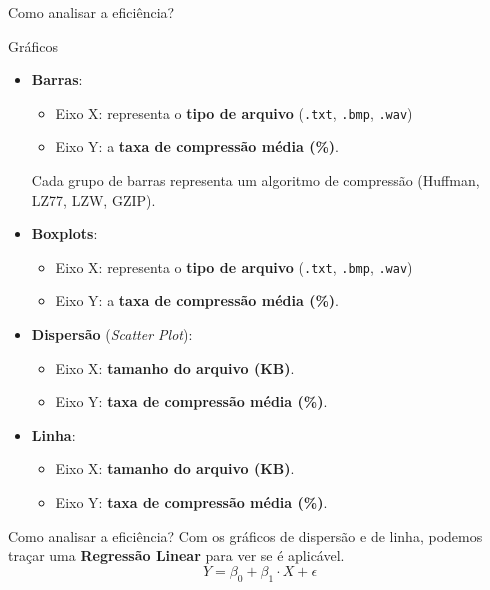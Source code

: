 \documentclass{beamer}
\begin{document}
    \begin{frame}{Como analisar a eficiência?}
        \begin{block}{Gráficos}
            \begin{itemize}
                \item \textbf{Barras}: 
                    \begin{itemize}
                        \item Eixo X: representa o \textbf{tipo de arquivo} (\texttt{.txt}, \texttt{.bmp},
                                \texttt{.wav})
                        \item Eixo Y: a \textbf{taxa de compressão média (\%)}.
                    \end{itemize}
                    Cada grupo de barras representa um algoritmo de compressão (Huffman, LZ77, LZW, GZIP).
                \item \textbf{Boxplots}: 
                    \begin{itemize}
                        \item Eixo X: representa o \textbf{tipo de arquivo} (\texttt{.txt}, \texttt{.bmp},
                                \texttt{.wav})
                        \item Eixo Y: a \textbf{taxa de compressão média (\%)}.
                    \end{itemize}
                \item \textbf{Dispersão} (\textit{Scatter Plot}):
                    \begin{itemize}
                        \item Eixo X: \textbf{tamanho do arquivo (KB)}.
                        \item Eixo Y: \textbf{taxa de compressão média (\%)}.
                    \end{itemize}
                \item \textbf{Linha}:
                    \begin{itemize}
                        \item Eixo X: \textbf{tamanho do arquivo (KB)}.
                        \item Eixo Y: \textbf{taxa de compressão média (\%)}.
                    \end{itemize}
            \end{itemize}
        \end{block}
    \end{frame}

    \begin{frame}{Como analisar a eficiência?}
        Com os gráficos de dispersão e de linha, podemos traçar uma \textbf{Regressão Linear} para ver se é
        aplicável.
        \[
        Y = \beta_0 + \beta_1 \cdot X + \epsilon
        \]
    \end{frame}
\end{document}
